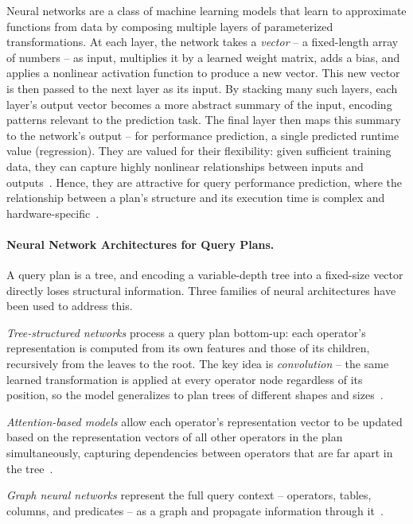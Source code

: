 Neural networks are a class of machine learning models that learn to approximate functions from data by composing multiple layers of parameterized transformations.
At each layer, the network takes a \emph{vector} -- a fixed-length array of numbers -- as input, multiplies it by a learned weight matrix, adds a bias, and applies a nonlinear activation function to produce a new vector.
This new vector is then passed to the next layer as its input.
By stacking many such layers, each layer's output vector becomes a more abstract summary of the input, encoding patterns relevant to the prediction task.
The final layer then maps this summary to the network's output -- for performance prediction, a single predicted runtime value (regression).
They are valued for their flexibility: given sufficient training data, they can capture highly nonlinear relationships between inputs and outputs~\parencite{deeplearning}.
Hence, they are attractive for query performance prediction, where the relationship between a plan's structure and its execution time is complex and hardware-specific~\parencite{t3}.

\paragraph{Neural Network Architectures for Query Plans.}
A query plan is a tree, and encoding a variable-depth tree into a fixed-size vector directly loses structural information.
Three families of neural architectures have been used to address this.

\emph{Tree-structured networks} process a query plan bottom-up: each operator's representation is computed from its own features and those of its children, recursively from the leaves to the root.
The key idea is \emph{convolution} -- the same learned transformation is applied at every operator node regardless of its position, so the model generalizes to plan trees of different shapes and sizes~\parencite{deeplearning, e2e, qppnet}.

\emph{Attention-based models} allow each operator's representation vector to be updated based on the representation vectors of all other operators in the plan simultaneously, capturing dependencies between operators that are far apart in the tree~\parencite{queryformer}.

\emph{Graph neural networks} represent the full query context -- operators, tables, columns, and predicates -- as a graph and propagate information through it~\parencite{zeroshot}.


